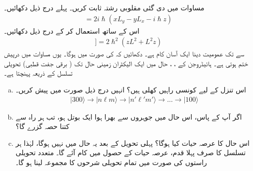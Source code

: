 مساوات      میں دی گئی  مقلوبی  رشتہ ثابت کریں۔   پہلے درج ذیل دکھائیں۔
\begin{align*}
	[L^2, z] = 2i\hslash(xL_y-yL_x-i\hslash z)
\end{align*}
اس  کے ساتھ    استعمال کر کے درج ذیل دکھائیں۔
\begin{align*}
[L^2, [L^2, z]] = 2\hslash^2(zL^2+L^2z)	
\end{align*}
 سے  تک عمومیت دینا  ایک آسان کام ہے۔
دکھائیں کہ  کی صورت میں  ہوگا۔  یوں مساوات   میں درپیش     ختم ہوتی ہے۔
ہائیڈروجن کے ،  ،    حال میں ایک الیکٹران زمینی حال تک ( برقی جفت قطبی)  تحویلی تسلسل  کے ذریعہ  پہنچتا ہے۔
\begin{enumerate}[a.]
\item
 اس تنزل کے لیے کونسی راہیں کھلی ہیں؟ انہیں درج ذیل صورت میں پیش کریں۔
\begin{align*}
	|300\rangle\to | n\ell m\rangle\to | n'\ell'm'\rangle\to\dots\to|100\rangle
\end{align*}
\item
 اگر آپ کے پاس،   اس حال میں جوہروں سے بھرا ہوا   ایک بوتل ہو،  تب ہر راہ  سے کتنا حصہ گزرے گا؟
\item
 اس حال کا عرصہ حیات کیا ہوگا؟    پہلی تحویل کے بعد یہ حال  میں نہیں ہوگا،  لہٰذا ہر  تسلسل   کا    صرف پہلا قدم،  عرصہ حیات  کے حصول میں کام آئے گا۔ متعدد تحویلی  راستوں کی صورت میں تمام تحویلی شرحوں  کا مجموعہ لینا ہو گا۔
 \end{enumerate}

